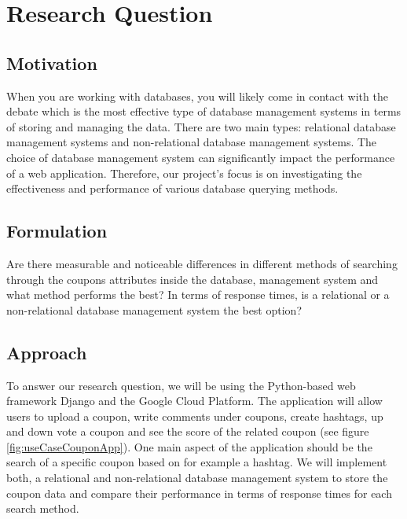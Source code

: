 \section{Research Question}
\subsection{Motivation}
When you are working with databases, you will likely come in contact with the debate which is the most effective type of database management systems in terms of storing and managing the data. There are two main types: relational database management systems and non-relational database management systems. The choice of database management system can significantly impact the performance of a web application. Therefore, our project's focus is on investigating the effectiveness and performance of various database querying methods.

\subsection{Formulation}
Are there measurable and noticeable differences in different methods of searching through the coupons attributes inside the database, management system and what method performs the best? In terms of response times, is a relational or a non-relational database management system the best option? 

\subsection{Approach}
To answer our research question, we will be using the Python-based web framework Django and the Google Cloud Platform. The application will allow users to upload a coupon, write comments under coupons, create hashtags, up and down vote a coupon and see the score of the related coupon (see figure \ref{fig:useCaseCouponApp}). One main aspect of the application should be the search of a specific coupon based on for example a hashtag. We will implement both, a relational and non-relational database management system to store the coupon data and compare their performance in terms of response times for each search method.

